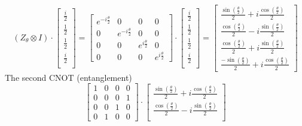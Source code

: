 \documentclass{article}
\begin{document}
\begin{itemize}
        \[
        (Z_\theta \otimes I) \cdot \begin{bmatrix}
            \frac{i}{2} \\
            \frac{1}{2} \\
            \frac{1}{2} \\
            \frac{i}{2} \\
        \end{bmatrix} = 
        \begin{bmatrix}
            e^{-i \frac{\theta}{2}} & 0 & 0 & 0\\
            0 & e^{-i \frac{\theta}{2}} & 0 & 0 \\
            0 & 0 & e^{i \frac{\theta}{2}} & 0\\
            0 & 0 & 0 & e^{i \frac{\theta}{2}}
        \end{bmatrix}
        \cdot
        \begin{bmatrix}
            \frac{i}{2} \\
            \frac{1}{2} \\
            \frac{1}{2} \\
            \frac{i}{2} \\
        \end{bmatrix} =
        \begin{bmatrix} 
        \frac{\sin \left(\frac{\theta}{2}\right)}{2} + i \frac{\cos \left(\frac{\theta}{2}\right)}{2} \\
        \frac{\cos \left(\frac{\theta}{2}\right)}{2} - i \frac{\sin \left(\frac{\theta}{2}\right)}{2} \\
        \frac{\cos \left(\frac{\theta}{2}\right)}{2} + i \frac{\sin \left(\frac{\theta}{2}\right)}{2} \\
        \frac{-\sin \left(\frac{\theta}{2}\right)}{2} + i \frac{\cos \left(\frac{\theta}{2}\right)}{2}
        \end{bmatrix}
        \]
    The second CNOT (entanglement)
    \[
        \begin{bmatrix}
            1 & 0 & 0 & 0\\
            0 & 0 & 0 & 1\\
            0 & 0 & 1 & 0\\
            0 & 1 & 0 & 0
        \end{bmatrix}
        \cdot
        \begin{bmatrix} 
            \frac{\sin \left(\frac{\theta}{2}\right)}{2} + i \frac{\cos \left(\frac{\theta}{2}\right)}{2} \\
            \frac{\cos \left(\frac{\theta}{2}\right)}{2} - i \frac{\sin \left(\frac{\theta}{2}\right)}{2} \\

\end{bmatrix}\]
\end{itemize}
\end{document}
